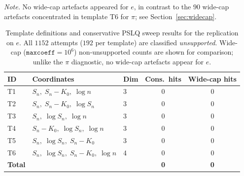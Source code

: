 \begin{table}[ht]
\centering
\caption{Template definitions and conservative PSLQ sweep results for the replication on $e$. All $1152$ attempts ($192$ per template) are classified \emph{unsupported}. Wide-cap ($\texttt{maxcoeff}=10^6$) non-unsupported counts are shown for comparison; unlike the $\pi$ diagnostic, no wide-cap artefacts appear for $e$.}
\smallskip
\emph{Note.} No wide-cap artefacts appeared for $e$, in contrast to the $90$ wide-cap artefacts concentrated in template T6 for $\pi$; see Section~\ref{sec:widecap}.
\smallskip
\begin{tabular}{lllcc}
\hline
ID & Coordinates & Dim & Cons.\ hits & Wide-cap hits \\
\hline
T1 & $S_n,\; S_n{-}K_0,\; \log n$ & 3 & 0 & 0 \\
T2 & $S_n,\; S_n{-}K_0,\; \log S_n$ & 3 & 0 & 0 \\
T3 & $S_n,\; \log S_n,\; \log n$ & 3 & 0 & 0 \\
T4 & $S_n{-}K_0,\; \log S_n,\; \log n$ & 3 & 0 & 0 \\
T5 & $S_n,\; \log S_n,\; S_n{-}K_0$ & 3 & 0 & 0 \\
T6 & $S_n,\; \log S_n,\; S_n{-}K_0,\; \log n$ & 4 & 0 & 0 \\
\hline
\textbf{Total} & & & \textbf{0} & \textbf{0} \\
\hline
\end{tabular}
\label{tab:templates-e}
\end{table}
